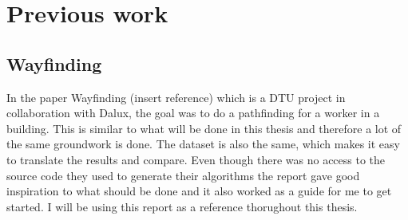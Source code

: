 \section{Previous work}
\subsection{Wayfinding}
In the paper Wayfinding (insert reference) which is a DTU project in collaboration with Dalux, the goal was to do a pathfinding for a worker in a building. This is similar to what will be done in this thesis and therefore a lot of the same groundwork is done. The dataset is also the same, which makes it easy to translate the results and compare. Even though there was no access to the source code they used to generate their algorithms the report gave good inspiration to what should be done and it also worked as a guide for me to get started. I will be using this report as a reference thorughout this thesis.

